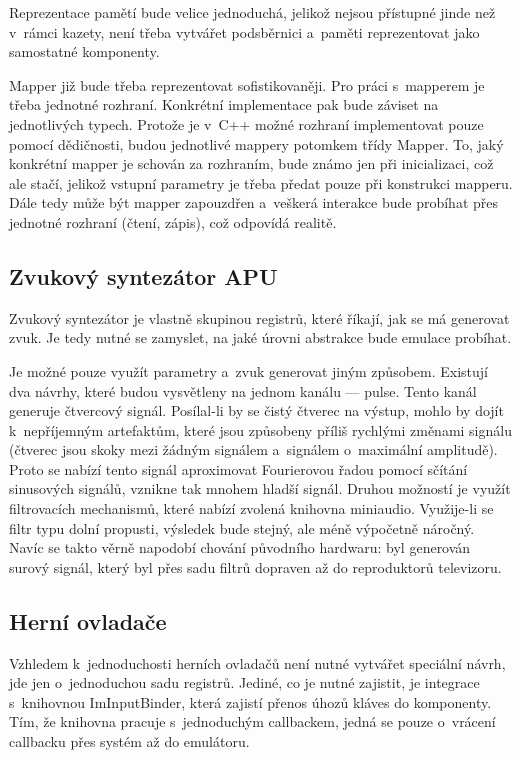 Reprezentace pamětí bude velice jednoduchá, jelikož nejsou přístupné jinde než v~rámci kazety, není třeba vytvářet podsběrnici a~paměti reprezentovat jako samostatné komponenty. 

Mapper již bude třeba reprezentovat sofistikovaněji. Pro práci s~mapperem je třeba jednotné rozhraní. Konkrétní implementace pak bude záviset na jednotlivých typech. Protože je v~C++ možné rozhraní implementovat pouze pomocí dědičnosti, budou jednotlivé mappery potomkem třídy Mapper. To, jaký konkrétní mapper je schován za rozhraním, bude známo jen při inicializaci, což ale stačí, jelikož vstupní parametry je třeba předat pouze při konstrukci mapperu. Dále tedy může být mapper zapouzdřen a~veškerá interakce bude probíhat přes jednotné rozhraní (čtení, zápis), což odpovídá realitě.

\subsection{Zvukový syntezátor APU}
Zvukový syntezátor je vlastně skupinou registrů, které říkají, jak se má generovat zvuk. Je tedy nutné se zamyslet, na jaké úrovni abstrakce bude emulace probíhat.

Je možné pouze využít parametry a~zvuk generovat jiným způsobem. Existují dva návrhy, které budou vysvětleny na jednom kanálu --- pulse. Tento kanál generuje čtvercový signál. Posílal-li by se čistý čtverec na výstup, mohlo by dojít k~nepříjemným artefaktům, které jsou způsobeny příliš rychlými změnami signálu (čtverec jsou skoky mezi žádným signálem a~signálem o~maximální amplitudě). Proto se nabízí tento signál aproximovat Fourierovou řadou pomocí sčítání sinusových signálů, vznikne tak mnohem hladší signál. Druhou možností je využít filtrovacích mechanismů, které nabízí zvolená knihovna miniaudio. Využije-li se filtr typu dolní propusti, výsledek bude stejný, ale méně výpočetně náročný. Navíc se takto věrně napodobí chování původního hardwaru: byl generován surový signál, který byl přes sadu filtrů dopraven až do reproduktorů televizoru.

\subsection{Herní ovladače}
Vzhledem k~jednoduchosti herních ovladačů není nutné vytvářet speciální návrh, jde jen o~jednoduchou sadu registrů. Jediné, co je nutné zajistit, je integrace s~knihovnou ImInputBinder, která zajistí přenos úhozů kláves do komponenty. Tím, že knihovna pracuje s~jednoduchým callbackem, jedná se pouze o~vrácení callbacku přes systém až do emulátoru.

